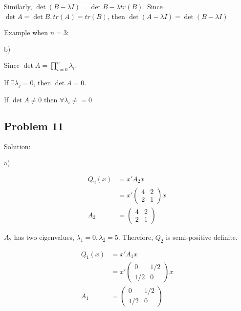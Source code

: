 \documentclass[letterpaper, 11pt]{article}
\newcommand{\1}{\mathds{1}}	%
\theoremstyle{definition}
\begin{document}
Similarly, $\det (B - \lambda I) = \det B - \lambda tr(B)$. Since $\det A = \det B, tr(A) = tr(B)$, then $\det (A-\lambda I)  = \det (B - \lambda I)$

Example when $n = 3$:


b)

Since $\det A = \prod_{i=0}^{n}\lambda_i$.

If $\exists \lambda_{j} = 0$, then $\det A = 0$.

If $\det A \neq 0$ then $\forall \lambda_{i} \neq =0$


\subsection*{Problem 11}

Solution:

a)

\begin{align*}
    Q_{2}(x) & =x'A_{2}x         \\
             & =x'\begin{pmatrix}
                      4 & 2 \\
                      2 & 1
                  \end{pmatrix}x \\
    A_{2}    & = \begin{pmatrix}
                     4 & 2 \\
                     2 & 1
                 \end{pmatrix}
\end{align*}

$A_{2} $ has two eigenvalues, $\lambda_{1} = 0, \lambda_{2}=5$. Therefore, $Q_{2}$ is semi-positive definite.

\begin{align*}
    Q_{1}(x) & =x'A_{1}x          \\
             & = x'\begin{pmatrix}
                       0   & 1/2 \\
                       1/2 & 0
                   \end{pmatrix}x \\
    A_{1}    & =\begin{pmatrix}
                    0   & 1/2 \\
                    1/2 & 0
                \end{pmatrix}
\end{align*}
\end{document}
